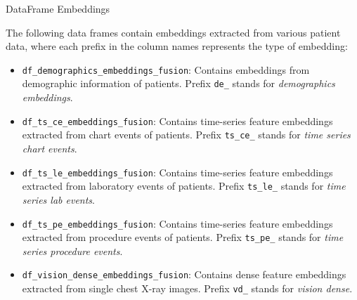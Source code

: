 \documentclass{sintefbeamer}
\theoremstyle{definition}
\begin{document}
\begin{frame}{DataFrame Embeddings}
\footnotesize

The following data frames contain embeddings extracted from various patient data, where each prefix in the column names represents the type of embedding:

\begin{itemize}
  \item \texttt{df\_demographics\_embeddings\_fusion}: Contains embeddings from demographic information of patients. Prefix \texttt{de\_} stands for \emph{demographics embeddings}.
  
  \item \texttt{df\_ts\_ce\_embeddings\_fusion}: Contains time-series feature embeddings extracted from chart events of patients. Prefix \texttt{ts\_ce\_}  stands for \emph{time series chart events}.
  
  \item \texttt{df\_ts\_le\_embeddings\_fusion}: Contains time-series feature embeddings extracted from laboratory events of patients. Prefix \texttt{ts\_le\_} stands for \emph{time series lab events}.
  
  \item \texttt{df\_ts\_pe\_embeddings\_fusion}: Contains time-series feature embeddings extracted from procedure events of patients. Prefix \texttt{ts\_pe\_}  stands for \emph{time series procedure events}.
  
  \item \texttt{df\_vision\_dense\_embeddings\_fusion}: Contains dense feature embeddings extracted from single chest X-ray images. Prefix \texttt{vd\_}  stands for \emph{vision dense}.

\end{itemize}

\end{frame}
\end{document}
